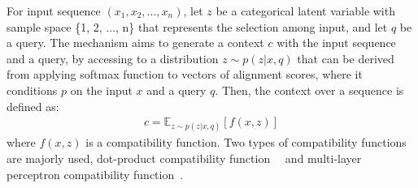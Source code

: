 For input sequence $(x_1, x_2, ..., x_n)$, let $z$ be a categorical latent variable with sample space \{1, 2, ..., n\} that represents the selection among input, and let $q$ be a query. The mechanism aims to generate a context $c$ with the input sequence and a query, by accessing to a distribution $z \mathtt{\sim} p(z|x, q)$ that can be derived from applying softmax function to vectors of alignment scores, where it conditions $p$ on the input $x$ and a query $q$. Then, the context over a sequence is defined as:
\begin{align*}
    c = \mathbb{E}_{z \mathtt{\sim} p(z|x, q)} [f(x, z)]
\end{align*}
where $f(x, z)$ is a compatibility function. Two types of compatibility functions are majorly used, dot-product compatibility function~\citep{LuongPM15}~\citep{vaswani2017attention} and multi-layer perceptron compatibility function~\citep{bah2015}. 

